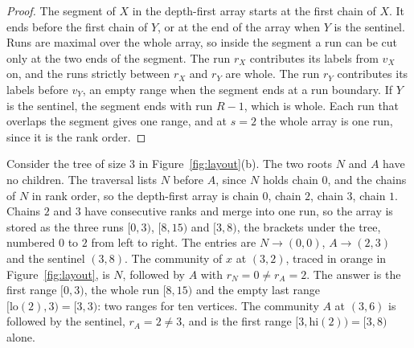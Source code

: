 \begin{proof}
The segment of $X$ in the depth-first array starts at the first chain of $X$.
%
It ends before the first chain of $Y$, or at the end of the array when $Y$ is the sentinel.
%
Runs are maximal over the whole array, so inside the segment a run can be cut only at the two ends of the segment.
%
The run $r_X$ contributes its labels from $v_X$ on, and the runs strictly between $r_X$ and $r_Y$ are whole.
%
The run $r_Y$ contributes its labels before $v_Y$, an empty range when the segment ends at a run boundary.
%
If $Y$ is the sentinel, the segment ends with run $R-1$, which is whole.
%
Each run that overlaps the segment gives one range, and at $s=2$ the whole array is one run, since it is the rank order.
\end{proof}
\begin{example}\label{ex:runs}
Consider the tree of size $3$ in Figure~\ref{fig:layout}(b).
%
The two roots $N$ and $A$ have no children.
%
The traversal lists $N$ before $A$, since $N$ holds chain $0$, and the chains of $N$ in rank order, so the depth-first array is chain $0$, chain $2$, chain $3$, chain $1$.
%
Chains $2$ and $3$ have consecutive ranks and merge into one run, so the array is stored as the three runs $[0,3)$, $[8,15)$ and $[3,8)$, the brackets under the tree, numbered $0$ to $2$ from left to right.
%
The entries are $N\to(0,0)$, $A\to(2,3)$ and the sentinel $(3,8)$.
%
The community of $x$ at $(3,2)$, traced in orange in Figure~\ref{fig:layout}, is $N$, followed by $A$ with $r_N=0\ne r_A=2$.
%
The answer is the first range $[0,3)$, the whole run $[8,15)$ and the empty last range $[\mathrm{lo}(2),3)=[3,3)$: two ranges for ten vertices.
%
The community $A$ at $(3,6)$ is followed by the sentinel, $r_A=2\ne3$, and is the first range $[3,\mathrm{hi}(2))=[3,8)$ alone.
\end{example}

